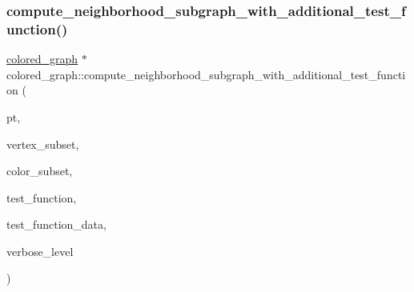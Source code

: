 \subsubsection{\texorpdfstring{compute\+\_\+neighborhood\+\_\+subgraph\+\_\+with\+\_\+additional\+\_\+test\+\_\+function()}{compute\_neighborhood\_subgraph\_with\_additional\_test\_function()}}
{\footnotesize\ttfamily \mbox{\hyperlink{classcolored__graph}{colored\+\_\+graph}} $\ast$ colored\+\_\+graph\+::compute\+\_\+neighborhood\+\_\+subgraph\+\_\+with\+\_\+additional\+\_\+test\+\_\+function (\begin{DoxyParamCaption}\item[{\mbox{\hyperlink{galois_8h_a09fddde158a3a20bd2dcadb609de11dc}{I\+NT}}}]{pt,  }\item[{\mbox{\hyperlink{classfancy__set}{fancy\+\_\+set}} $\ast$\&}]{vertex\+\_\+subset,  }\item[{\mbox{\hyperlink{classfancy__set}{fancy\+\_\+set}} $\ast$\&}]{color\+\_\+subset,  }\item[{\mbox{\hyperlink{galois_8h_a09fddde158a3a20bd2dcadb609de11dc}{I\+NT}}($\ast$)(\mbox{\hyperlink{classcolored__graph}{colored\+\_\+graph}} $\ast$CG, \mbox{\hyperlink{galois_8h_a09fddde158a3a20bd2dcadb609de11dc}{I\+NT}} test\+\_\+point, \mbox{\hyperlink{galois_8h_a09fddde158a3a20bd2dcadb609de11dc}{I\+NT}} \mbox{\hyperlink{clique__finder_8_c_aec1f1a2b30fdca8844c2932384483145}{pt}}, void $\ast$test\+\_\+function\+\_\+data, \mbox{\hyperlink{galois_8h_a09fddde158a3a20bd2dcadb609de11dc}{I\+NT}} \mbox{\hyperlink{simeon_8_c_a818073fbcc2f439e7c56952f67386122}{verbose\+\_\+level}})}]{test\+\_\+function,  }\item[{void $\ast$}]{test\+\_\+function\+\_\+data,  }\item[{\mbox{\hyperlink{galois_8h_a09fddde158a3a20bd2dcadb609de11dc}{I\+NT}}}]{verbose\+\_\+level }\end{DoxyParamCaption})}

\mbox{\label{classcolored__graph_ac5fd42765545792be5d4533b782e3320}} 
